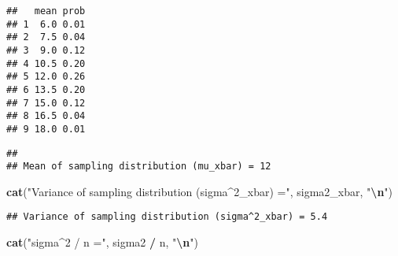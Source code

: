 \documentclass[
]{article}
\newenvironment{Shaded}{\begin{snugshade}}{\end{snugshade}}
\newcommand{\CommentTok}[1]{\textcolor[rgb]{0.56,0.35,0.01}{\textit{#1}}}
\newcommand{\DecValTok}[1]{\textcolor[rgb]{0.00,0.00,0.81}{#1}}
\newcommand{\FunctionTok}[1]{\textcolor[rgb]{0.13,0.29,0.53}{\textbf{#1}}}
\newcommand{\NormalTok}[1]{#1}
\newcommand{\OtherTok}[1]{\textcolor[rgb]{0.56,0.35,0.01}{#1}}
\newcommand{\SpecialCharTok}[1]{\textcolor[rgb]{0.81,0.36,0.00}{\textbf{#1}}}
\newcommand{\StringTok}[1]{\textcolor[rgb]{0.31,0.60,0.02}{#1}}
\begin{document}
\begin{verbatim}
##   mean prob
## 1  6.0 0.01
## 2  7.5 0.04
## 3  9.0 0.12
## 4 10.5 0.20
## 5 12.0 0.26
## 6 13.5 0.20
## 7 15.0 0.12
## 8 16.5 0.04
## 9 18.0 0.01
\end{verbatim}

\begin{Shaded}
\end{Shaded}

\begin{verbatim}
## 
## Mean of sampling distribution (mu_xbar) = 12
\end{verbatim}

\begin{Shaded}
\begin{Highlighting}[]
\FunctionTok{cat}\NormalTok{(}\StringTok{"Variance of sampling distribution (sigma\^{}2\_xbar) ="}\NormalTok{, sigma2\_xbar, }\StringTok{"}\SpecialCharTok{\textbackslash{}n}\StringTok{"}\NormalTok{)}
\end{Highlighting}
\end{Shaded}

\begin{verbatim}
## Variance of sampling distribution (sigma^2_xbar) = 5.4
\end{verbatim}

\begin{Shaded}
\begin{Highlighting}[]
\FunctionTok{cat}\NormalTok{(}\StringTok{"sigma\^{}2 / n ="}\NormalTok{, sigma2 }\SpecialCharTok{/}\NormalTok{ n, }\StringTok{"}\SpecialCharTok{\textbackslash{}n}\StringTok{"}\NormalTok{)}
\end{Highlighting}
\end{Shaded}
\end{document}

